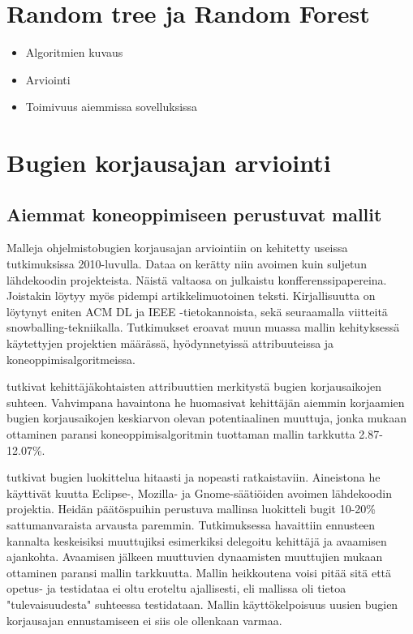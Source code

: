 \documentclass[utf8]{gradu3}
\begin{document}
\section{Random tree ja Random Forest}
\begin{itemize}
  \item Algoritmien kuvaus
  \item Arviointi
  \item Toimivuus aiemmissa sovelluksissa
\end{itemize}

\section{Bugien korjausajan arviointi}


\subsection{Aiemmat koneoppimiseen perustuvat mallit}
Malleja ohjelmistobugien korjausajan arviointiin on kehitetty useissa
tutkimuksissa 2010-luvulla. Dataa on kerätty niin avoimen kuin suljetun
lähdekoodin projekteista. Näistä valtaosa on julkaistu konfferenssipapereina.
Joistakin löytyy myös pidempi artikkelimuotoinen teksti. Kirjallisuutta on
löytynyt eniten ACM DL ja IEEE -tietokannoista, sekä seuraamalla viitteitä
snowballing-tekniikalla. Tutkimukset eroavat muun muassa mallin kehityksessä
käytettyjen projektien määrässä, hyödynnetyissä attribuuteissa ja
koneoppimisalgoritmeissa.

\textcite{Anh-2011} tutkivat kehittäjäkohtaisten attribuuttien merkitystä bugien
korjausaikojen suhteen. Vahvimpana havaintona he huomasivat kehittäjän aiemmin
korjaamien bugien korjausaikojen keskiarvon olevan potentiaalinen muuttuja,
jonka mukaan ottaminen paransi koneoppimisalgoritmin tuottaman mallin tarkkutta
2.87-12.07\%.

\textcite{Giger-2010} tutkivat bugien luokittelua hitaasti ja nopeasti
ratkaistaviin. Aineistona he käyttivät kuutta Eclipse-, Mozilla- ja
Gnome-säätiöiden avoimen lähdekoodin projektia. Heidän päätöspuihin perustuva
mallinsa luokitteli bugit 10-20\% sattumanvaraista arvausta paremmin.
Tutkimuksessa havaittiin ennusteen kannalta keskeisiksi muuttujiksi esimerkiksi
delegoitu kehittäjä ja avaamisen ajankohta. Avaamisen jälkeen muuttuvien
dynaamisten muuttujien mukaan ottaminen paransi mallin tarkkuutta. Mallin
heikkoutena voisi pitää sitä että opetus- ja testidataa ei oltu eroteltu
ajallisesti, eli mallissa oli tietoa "tulevaisuudesta" suhteessa testidataan.
Mallin käyttökelpoisuus uusien bugien korjausajan ennustamiseen ei siis ole
ollenkaan varmaa.
\end{document}
